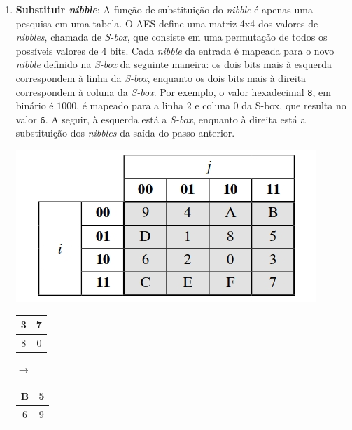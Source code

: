 \documentclass{article}
\begin{document}
\begin{enumerate}
    \item \textbf{Substituir \textit{nibble}}: A função de substituição do
    \textit{nibble} é apenas uma pesquisa em uma tabela. O AES define uma
    matriz 4x4 dos valores de \textit{nibbles}, chamada de \textit{S-box}, que
    consiste em uma permutação de todos os possíveis valores de 4 bits. Cada
    \textit{nibble} da entrada é mapeada para o novo \textit{nibble} definido
    na \textit{S-box} da seguinte maneira: os dois bits mais à esquerda
    correspondem à linha da \textit{S-box}, enquanto os dois bits mais à
    direita correspondem à coluna da \textit{S-box}. Por exemplo, o valor
    hexadecimal \texttt{8}, em binário é $1000$, é mapeado para a linha 2 e
    coluna 0 da S-box, que resulta no valor \texttt{6}. A seguir, à esquerda
    está a \textit{S-box}, enquanto à direita está a substituição dos
    \textit{nibbles} da saída do passo anterior.

    \begin{minipage}{0.32\textwidth}
        \includegraphics[width=\linewidth]{imgs/s-box.jpg}
    \end{minipage}
    \begin{minipage}{0.6\textwidth}
        \begin{tabular}{|c|c|}
            \hline
            3 & 7  \\
            \hline
            8 & 0 \\
            \hline
        \end{tabular}
        $\to$
        \begin{tabular}{|c|c|}
            \hline
            B & 5  \\
            \hline
            6 & 9 \\
            \hline
        \end{tabular}
    \end{minipage}


\end{enumerate}
\end{document}
